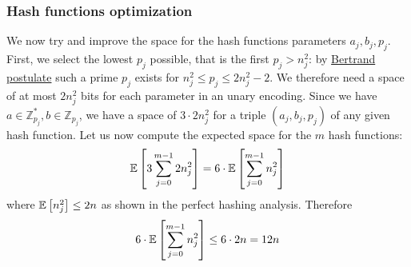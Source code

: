 \subsubsection{Hash functions optimization}
We now try and improve the space for the hash functions parameters $a_j, b_j, p_j$.
First, we select the lowest $p_j$ possible, that is the first $p_j > n_j^2$: by
\href{https://en.wikipedia.org/wiki/Bertrand\%27s_postulate}{Bertrand postulate}
such a prime $p_j$ exists for $n_j^2 \leq p_j \leq 2n_j^2 - 2$.
We therefore need a space of at most $2n_j^2$ bits for each parameter in an unary
encoding.
Since we have $a \in \mathbb{Z}_{p_j}^*, b \in \mathbb{Z}_{p_j}$, we have a space
of $3 \cdot 2n_j^2$ for a triple $(a_j, b_j, p_j)$ of any given hash function.
Let us now compute the expected space for the $m$ hash functions:
\begin{equation*}
\mathbb{E}\left[{3 \sum_{j=0}^{m-1}2n_j^2}\right] =
6 \cdot \mathbb{E}\left[{\sum_{j=0}^{m-1}n_j^2}\right]
\end{equation*}
where $\mathbb{E}\left[{n_j^2}\right] \leq 2n$ as shown in the perfect hashing analysis.
Therefore
\begin{equation*}
6 \cdot \mathbb{E}\left[{\sum_{j=0}^{m-1} n_j^2}\right] \leq 6 \cdot 2n = 12n
\end{equation*}
